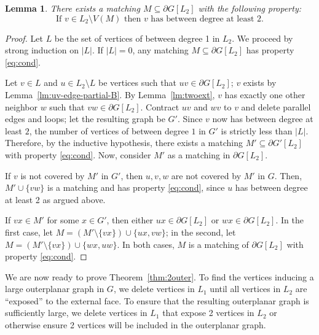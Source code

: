 \documentclass[11pt]{article}
\newtheorem{lemma}[theorem]{Lemma}
\begin{document}
\begin{lemma} \label{lm:match}
 There exists a matching $M\subseteq \partial G[L_2]$ with the following property: 
\begin{equation} \label{eq:cond}
\mbox{If } v\in L_2 \setminus V(M) \mbox{ then }v \mbox{ has between degree at least 2}. 
\end{equation}

\end{lemma}

\begin{proof}
Let $L$ be the set of vertices of between degree 1 in $L_2$. We proceed by strong induction on $|L|$. If $|L|=0$, any matching $M \subseteq \partial G[L_2]$ has property \eqref{eq:cond}.

Let $v\in L$ and $u \in L_2 \setminus L$ be vertices such that $uv \in \partial G[L_2]$; $v$ exists by Lemma~\ref{lm:uv-edge-partial-B}. By Lemma~\ref{lm:twoext}, $v$ has exactly one other neighbor $w$ such that $vw \in \partial G[L_2]$. Contract $uv$ and $wv$ to $v$ and delete parallel edges and loops; let the resulting graph be $G'$. Since $v$ now has between degree at least $2$, the number of vertices of between degree $1$ in $G'$ is strictly less than $|L|$. Therefore, by the inductive hypothesis, there exists a matching $M'\subseteq \partial G'[L_2]$ with property \eqref{eq:cond}. Now, consider $M'$ as a matching in $\partial G[L_2]$. 

If $v$ is not covered by $M'$ in $G'$, then $u, v, w$ are not covered by $M'$ in $G$. Then, $M' \cup \{vw\}$ is a matching and has property \eqref{eq:cond}, since $u$ has between degree at least 2 as argued above. 

If $v x \in M'$ for some $x \in G'$, then either $u x \in \partial G[L_2]$ or $w x \in \partial G[L_2]$. In the first case, let $M =( M' \setminus \{v x\}) \cup \{u x, v w\}$; in the second, let  $M =( M' \setminus \{v x\}) \cup \{w x, u w\}$. In both cases, $M$ is a matching of $\partial G[L_2]$ with property \eqref{eq:cond}. 
\end{proof}



We are now ready to prove Theorem~\ref{thm:2outer}. To find the vertices inducing a large outerplanar graph in $G$, we delete vertices in $L_1$ until all vertices in $L_2$ are ``exposed'' to the external face. To ensure that the resulting outerplanar graph is sufficiently large, we delete vertices in $L_1$ that expose 2 vertices in $L_2$ or otherwise ensure 2 vertices will be included in the outerplanar graph.
\end{document}
